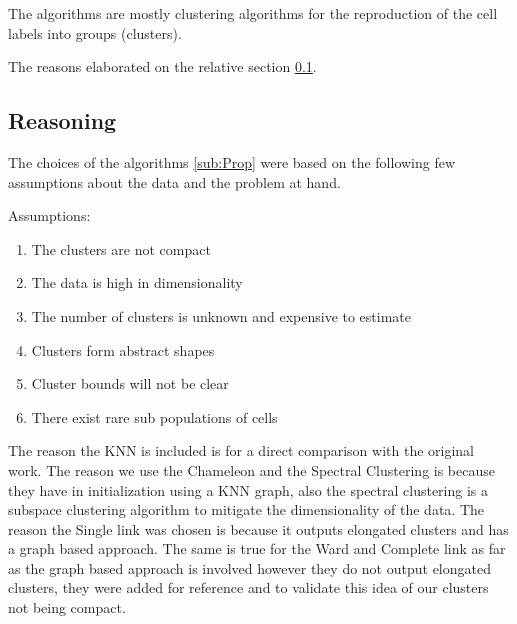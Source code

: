 \documentclass[12pt, a4paper]{article}
\begin{document}
\begin{multicols}{2}
            The algorithms are mostly clustering algorithms for the reproduction of the cell labels into groups (clusters).
            \newline

            The reasons elaborated on the relative section \ref{sub:Reasoning}.
            \newline


            \subsection{Reasoning}\label{sub:Reasoning} %

            The choices of the algorithms \ref{sub:Prop} were based on the following few assumptions about the data and the problem at hand.
            \newline

            Assumptions:

            \begin{enumerate}
                \item The clusters are not compact
                \item The data is high in dimensionality
                \item The number of clusters is unknown and expensive to estimate
                \item Clusters form abstract shapes
                \item Cluster bounds will not be clear
                \item There exist rare sub populations of cells
            \end{enumerate}

            The reason the KNN is included is for a direct comparison with the original work. The reason we use the Chameleon and the Spectral Clustering is because they have in initialization using a KNN graph, also the spectral clustering is a subspace clustering algorithm to mitigate the dimensionality of the data. The reason the Single link was chosen is because it outputs elongated clusters and has a graph based approach. The same is true for the Ward and Complete link as far as the graph based approach is involved however they do not output elongated clusters, they were added for reference and to validate this idea of our clusters not being compact.
            \newline


\end{multicols}
\end{document}
